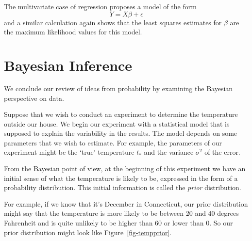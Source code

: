 \documentclass[
  11pt,
  letterpaper,
]{scrbook}
\theoremstyle{plain}
\theoremstyle{plain}
\theoremstyle{remark}
\begin{document}
The multivariate case of regression proposes a model of the form \[
Y=X\beta+\epsilon
\] and a similar calculation again shows that the least squares
estimates for \(\beta\) are the maximum likelihood values for this
model.

\hypertarget{bayesian-inference}{%
\section{Bayesian Inference}\label{bayesian-inference}}

We conclude our review of ideas from probability by examining the
Bayesian perspective on data.

Suppose that we wish to conduct an experiment to determine the
temperature outside our house. We begin our experiment with a
statistical model that is supposed to explain the variability in the
results. The model depends on some parameters that we wish to estimate.
For example, the parameters of our experiment might be the `true'
temperature \(t_*\) and the variance \(\sigma^2\) of the error.

From the Bayesian point of view, at the beginning of this experiment we
have an initial sense of what the temperature is likely to be, expressed
in the form of a probability distribution. This initial information is
called the \emph{prior} distribution.

For example, if we know that it's December in Connecticut, our prior
distribution might say that the temperature is more likely to be between
20 and 40 degrees Fahrenheit and is quite unlikely to be higher than 60
or lower than 0. So our prior distribution might look like
Figure~\ref{fig-tempprior}.
\end{document}
